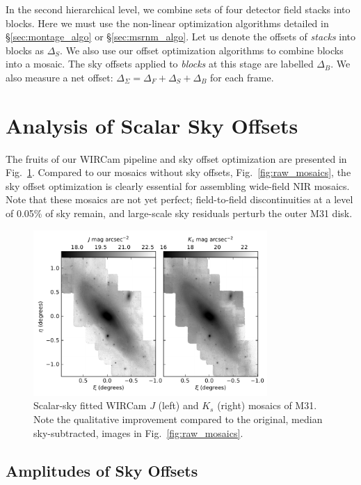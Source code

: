 \documentclass[iop]{emulateapj}
\newcommand{\Fig}[1]{Fig.~\ref{fig:#1}}  %
\newcommand{\Sec}[1]{\S\ref{sec:#1}}  %
\begin{document}
In the second hierarchical level, we combine sets of four detector field stacks into blocks.
Here we must use the non-linear optimization algorithms detailed in \Sec{montage_algo} or \Sec{msrnm_algo}.
Let us denote the offsets of \emph{stacks} into blocks as $\Delta_S$.
We also use our offset optimization algorithms to combine blocks into a mosaic. The sky offsets applied to \emph{blocks} at this stage are labelled $\Delta_B$. We also measure a net offset: $\Delta_\Sigma = \Delta_F + \Delta_S + \Delta_B$ for each frame.

\section{Analysis of Scalar Sky Offsets}
\label{sec:scalaranalysis}

The fruits of our WIRCam pipeline and sky offset optimization are presented in \Fig{scalar_mosaics}.
Compared to our mosaics without sky offsets, \Fig{raw_mosaics}, the sky offset optimization is clearly essential for assembling wide-field NIR mosaics.
Note that these mosaics are not yet perfect; field-to-field discontinuities at a level of 0.05\% of sky remain, and large-scale sky residuals perturb the outer M31 disk.

\begin{figure}[t]
	\centering
		\includegraphics[width=3.5in]{figs/scalar_mosaics}
	\caption{Scalar-sky fitted WIRCam $J$ (left) and $K_s$ (right) mosaics of M31. Note the qualitative improvement compared to the original, median sky-subtracted, images in \Fig{raw_mosaics}.}
	\label{fig:scalar_mosaics}
\end{figure}

\subsection{Amplitudes of Sky Offsets}
\label{sec:offset_amplitudes}
\end{document}
